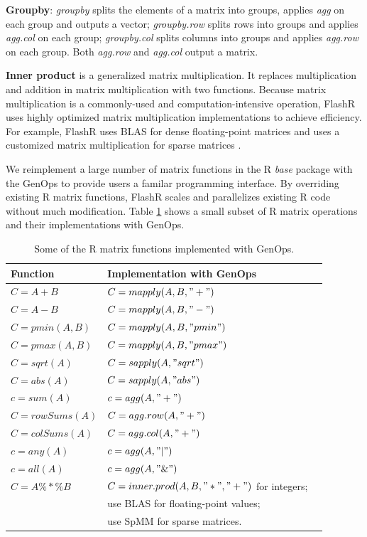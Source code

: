 \noindent \textbf{Groupby}: \textit{groupby} splits the elements of a matrix
into groups, applies \textit{agg} on each group and outputs a vector;
\textit{groupby.row} splits rows into groups and applies \textit{agg.col}
on each group; \textit{groupby.col} splits columns into groups and applies
\textit{agg.row} on each group. Both \textit{agg.row} and \textit{agg.col}
output a matrix.

\noindent \textbf{Inner product} is a generalized matrix multiplication.
It replaces multiplication and addition in matrix multiplication with
two functions. Because matrix multiplication is a commonly-used and
computation-intensive operation, FlashR uses highly optimized matrix
multiplication implementations to achieve efficiency. For example,
FlashR uses BLAS for dense floating-point matrices and uses a customized
matrix multiplication for sparse matrices \cite{SEM_SpMM}.

We reimplement a large number of matrix functions in the R \textit{base}
package with the GenOps to provide users a familar programming interface.
By overriding existing R matrix functions, FlashR scales and parallelizes
existing R code without much modification. Table \ref{tbl:Rfuns} shows
a small subset of R matrix operations and their implementations
with GenOps.

\begin{table}
\begin{center}
\footnotesize
\begin{tabular}{|l|l|l|}
\hline
Function & Implementation with GenOps \\
\hline
$C=A+B$ & $C=mapply(A, B, "+")$ \\
$C=A-B$ & $C=mapply(A, B, "-")$ \\
$C=pmin(A,B)$ & $C=mapply(A, B, "pmin")$ \\
$C=pmax(A,B)$ & $C=mapply(A, B, "pmax")$ \\
$C=sqrt(A)$ & $C=sapply(A, "sqrt")$ \\
$C=abs(A)$ & $C=sapply(A, "abs")$ \\
\hline
$c=sum(A)$ & $c=agg(A, "+")$ \\
$C=rowSums(A)$ & $C=agg.row(A, "+")$ \\
$C=colSums(A)$ & $C=agg.col(A, "+")$ \\
$c=any(A)$ & $c=agg(A, "|")$ \\
$c=all(A)$ & $c=agg(A, "\&")$ \\
\hline
$C=A \%*\% B$ & $C=inner.prod(A, B, "*", "+")$ for integers; \\
 & use BLAS for floating-point values; \\
 & use SpMM \cite{SEM_SpMM} for sparse matrices. \\
\hline
\end{tabular}
\normalsize
\end{center}
\caption{Some of the R matrix functions implemented with GenOps.}
\label{tbl:Rfuns}
\end{table}

